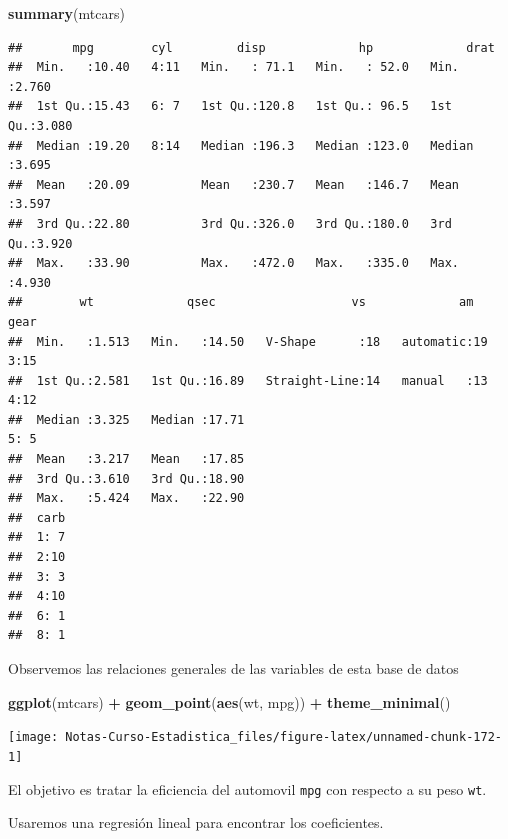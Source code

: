 \documentclass[
  12pt,
]{book}
\newenvironment{Shaded}{\begin{snugshade}}{\end{snugshade}}
\newcommand{\KeywordTok}[1]{\textcolor[rgb]{0.13,0.29,0.53}{\textbf{#1}}}
\newcommand{\NormalTok}[1]{#1}
\newcommand{\OperatorTok}[1]{\textcolor[rgb]{0.81,0.36,0.00}{\textbf{#1}}}
\newcommand{\StringTok}[1]{\textcolor[rgb]{0.31,0.60,0.02}{#1}}
\theoremstyle{definition}
\theoremstyle{definition}
\theoremstyle{definition}
\theoremstyle{remark}
\begin{document}
\begin{Shaded}
\begin{Highlighting}[]
\KeywordTok{summary}\NormalTok{(mtcars)}
\end{Highlighting}
\end{Shaded}

\begin{verbatim}
##       mpg        cyl         disp             hp             drat      
##  Min.   :10.40   4:11   Min.   : 71.1   Min.   : 52.0   Min.   :2.760  
##  1st Qu.:15.43   6: 7   1st Qu.:120.8   1st Qu.: 96.5   1st Qu.:3.080  
##  Median :19.20   8:14   Median :196.3   Median :123.0   Median :3.695  
##  Mean   :20.09          Mean   :230.7   Mean   :146.7   Mean   :3.597  
##  3rd Qu.:22.80          3rd Qu.:326.0   3rd Qu.:180.0   3rd Qu.:3.920  
##  Max.   :33.90          Max.   :472.0   Max.   :335.0   Max.   :4.930  
##        wt             qsec                   vs             am     gear  
##  Min.   :1.513   Min.   :14.50   V-Shape      :18   automatic:19   3:15  
##  1st Qu.:2.581   1st Qu.:16.89   Straight-Line:14   manual   :13   4:12  
##  Median :3.325   Median :17.71                                     5: 5  
##  Mean   :3.217   Mean   :17.85                                           
##  3rd Qu.:3.610   3rd Qu.:18.90                                           
##  Max.   :5.424   Max.   :22.90                                           
##  carb  
##  1: 7  
##  2:10  
##  3: 3  
##  4:10  
##  6: 1  
##  8: 1
\end{verbatim}

Observemos las relaciones generales de las variables de esta base de datos

\begin{Shaded}
\begin{Highlighting}[]
\KeywordTok{ggplot}\NormalTok{(mtcars) }\OperatorTok{+}\StringTok{ }\KeywordTok{geom_point}\NormalTok{(}\KeywordTok{aes}\NormalTok{(wt, mpg)) }\OperatorTok{+}\StringTok{ }\KeywordTok{theme_minimal}\NormalTok{()}
\end{Highlighting}
\end{Shaded}

\begin{center}\texttt{[image: Notas-Curso-Estadistica\_files/figure-latex/unnamed-chunk-172-1]} \end{center}

El objetivo es tratar la eficiencia del automovil \texttt{mpg} con respecto a su peso \texttt{wt}.

Usaremos una regresión lineal para encontrar los coeficientes.
\end{document}
